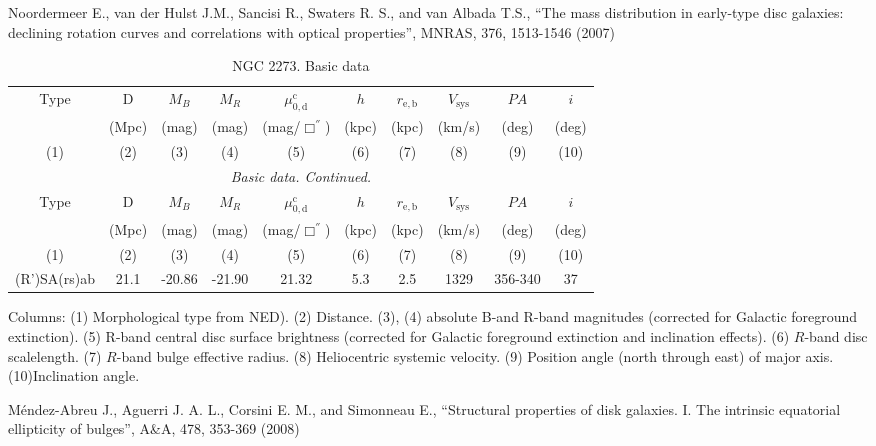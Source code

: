 \documentclass[english,10pt]{article}
\def\mm{\mathrm}
\begin{document}
\bigskip
\noindent
Noordermeer E., van der Hulst J.M., Sancisi R., 
Swaters R. S., and van Albada T.S., 
``The mass distribution in early-type disc galaxies: declining rotation
curves and correlations with optical properties'', 
MNRAS, 376, 1513-1546 (2007)

\begin{longtable}[c]{cccccccccc}
\caption{NGC 2273. Basic data} \\ 
\hline 
Type & D & $M_B$ & $M_R$ & $\mu_\mm{0,d}^\mm{c}$ & $h$ & $r_\mm{e,b}$
& $V_\mm{sys}$ & $PA$ & $i$ \\ 
& (Mpc) & (mag) & (mag) & (mag/$\Box^{''}$) & (kpc) & (kpc)
& (km/s) & (deg) & (deg) \\
(1)&(2)&(3)&(4)&(5)&(6)&(7)&(8)&(9)&(10) \\ 
\hline
\endfirsthead 
\hline
\multicolumn{10}{c}{\small\slshape Basic data. 
Continued. } \\ \hline
Type & D & $M_B$ & $M_R$ & $\mu_\mm{0,d}^\mm{c}$ & $h$ & $r_\mm{e,b}$
& $V_\mm{sys}$ & $PA$ & $i$ \\ 
& (Mpc) & (mag) & (mag) & (mag/$\Box^{''}$) & (kpc) & (kpc)
& (km/s) & (deg) & (deg) \\
(1)&(2)&(3)&(4)&(5)&(6)&(7)&(8)&(9)&(10) \\ 
\hline
\endhead 
\hline
(R’)SA(rs)ab & 21.1 & -20.86 & -21.90 & 21.32 & 5.3 & 2.5 
& 1329 & 356-340 & 37 \tabularnewline
\hline
\end{longtable}

Columns: 
(1) Morphological type from NED). 
(2) Distance. 
(3), (4) absolute B-and R-band magnitudes 
(corrected for Galactic foreground extinction).
(5) R-band central disc surface brightness 
(corrected for Galactic foreground extinction and inclination effects).
(6) $R$-band disc scalelength.
(7) $R$-band bulge effective radius.
(8) Heliocentric systemic velocity.
(9) Position angle (north through east) of major axis. 
(10)Inclination angle.

\bigskip
\noindent
M\'{e}ndez-Abreu J., Aguerri J. A. L., Corsini E. M., 
and Simonneau E., 
``Structural properties of disk galaxies. I. The intrinsic 
equatorial ellipticity of bulges'', 
A\&A, 478, 353-369 (2008)
\end{document}
